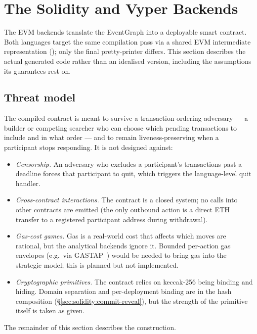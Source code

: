 \section{The Solidity and Vyper Backends}
\label{sec:solidity}

The EVM backends translate the EventGraph into a deployable smart
contract.  Both languages target the same compilation pass via a
shared EVM intermediate representation (); only the
final pretty-printer differs.  This section describes the actual
generated code rather than an idealised version, including the
assumptions its guarantees rest on.

\subsection{Threat model}
\label{sec:solidity:threats}

The compiled contract is meant to survive a transaction-ordering
adversary --- a builder or competing searcher who can choose which
pending transactions to include and in what order --- and to remain
liveness-preserving when a participant stops responding.  It is not
designed against:

\begin{itemize}\itemsep1pt
\item \emph{Censorship.}  An adversary who excludes a participant's
  transactions past a deadline forces that participant to quit, which
  triggers the language-level quit handler.
\item \emph{Cross-contract interactions.}  The contract is a closed
  system; no calls into other contracts are emitted (the only
  outbound action is a direct ETH transfer to a registered
  participant address during withdrawal).
\item \emph{Gas-cost games.}  Gas is a real-world cost that affects
  which moves are rational, but the analytical backends ignore it.
  Bounded per-action gas envelopes (e.g.\ via
  GASTAP~\citep{Albert2020Gastap}) would be needed to bring gas into
  the strategic model; this is planned but not implemented.
\item \emph{Cryptographic primitives.}  The contract relies on
  keccak-256 being binding and hiding.  Domain separation and
  per-deployment binding are in the hash composition
  (\S\ref{sec:solidity:commit-reveal}), but the strength of the
  primitive itself is taken as given.
\end{itemize}

The remainder of this section describes the construction.

